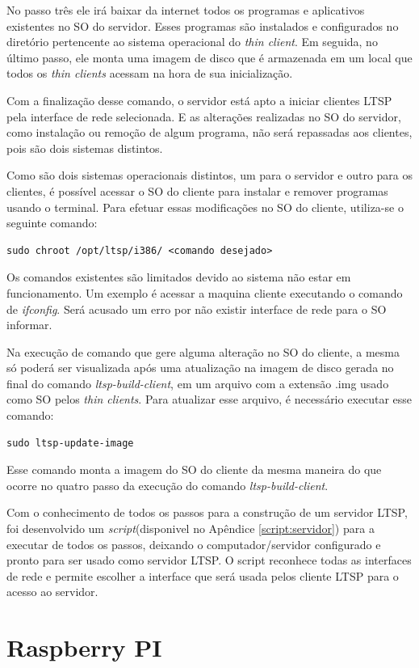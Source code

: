 \documentclass[
	12pt,				%
	openright,			%
	twoside,			%
	a4paper,			%
	chapter=TITLE,		%
	english,			%
	brazil				%
	]{abntex2}
\begin{document}
No passo três ele irá baixar da internet todos os programas e aplicativos existentes no SO do servidor. Esses programas são instalados e configurados no diretório pertencente ao sistema operacional do \textit{thin client}.  Em seguida, no último passo, ele monta uma imagem de disco que é armazenada em um local que todos os \textit{thin clients} acessam na hora de sua inicialização.

Com a finalização desse comando, o servidor está apto a iniciar clientes LTSP pela interface de rede selecionada. E as alterações realizadas no SO do servidor, como instalação ou remoção de algum programa, não será repassadas aos clientes, pois são dois sistemas distintos.

Como são dois sistemas operacionais distintos, um para o servidor e outro para os clientes, é possível acessar o SO do cliente para instalar e remover programas usando o terminal. Para efetuar essas modificações no SO do cliente, utiliza-se o seguinte comando:
\begin{verbatim}
sudo chroot /opt/ltsp/i386/ <comando desejado>
\end{verbatim}
Os comandos existentes são limitados devido ao sistema não estar em funcionamento. Um exemplo é acessar a maquina cliente executando o comando de \textit{ifconfig}. Será acusado um erro por não existir interface de rede para o SO informar.

Na execução de comando que gere alguma alteração no SO do cliente, a mesma só poderá ser visualizada após uma atualização na imagem de disco gerada no final do comando \textit{ltsp-build-client}, em um arquivo com a extensão .img usado como SO pelos \textit{thin clients}. Para atualizar esse arquivo, é necessário executar esse comando:
\begin{verbatim}
sudo ltsp-update-image
\end{verbatim}
Esse comando monta a imagem do SO do cliente da mesma maneira do que ocorre no quatro passo da execução do comando  \textit{ltsp-build-client}.

Com o conhecimento de todos os passos para a construção de um servidor LTSP, foi desenvolvido um \textit{script}(disponivel no Apêndice \ref{script:servidor}) para a executar de todos os passos, deixando o computador/servidor configurado e pronto para ser usado como servidor LTSP. O script reconhece todas as interfaces de rede e permite escolher a interface que será usada pelos cliente LTSP para o acesso ao servidor. 

\chapter{Raspberry PI}
\label{confRasp}
\end{document}
